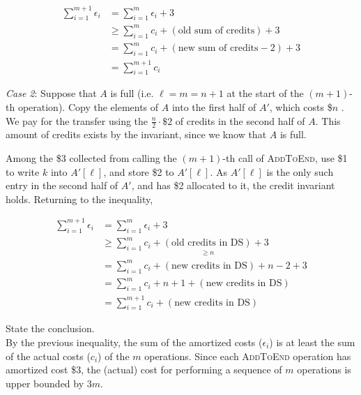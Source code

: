 \begin{description}
    \begin{align*}
        \sum_{i=1}^{m+1} \epsilon_i &= \sum_{i=1}^{m} \epsilon_i + 3 \\
        &\geq \sum_{i=1}^{m} c_i + (\text{old sum of credits}) + 3 \\
        &= \sum_{i=1}^{m} c_i + (\text{new sum of credits} - 2) + 3 \\
        &= \sum_{i=1}^{m+1} c_i
    \end{align*}

    \textit{Case 2}: Suppose that $A$ is full (i.e. $\ell = m = n + 1$ at the start of the $(m+1)$-th operation). Copy the elements of $A$ into the first half of $A'$, which costs \$$n$ . We pay for the transfer using the $\frac{n}{2} \cdot \$2$ of credits in the second half of $A$. This amount of credits exists by the invariant, since we know that $A$ is full. 

    Among the \$3 collected from calling the $(m+1)$-th call of \textsc{AddToEnd}, use \$1 to write $k$ into $A'[\ell]$, and store \$2 to $A'[\ell]$. As $A'[\ell]$ is the only such entry in the second half of $A'$, and has \$2 allocated to it, the credit invariant holds. Returning to the inequality,

    \begin{align*}
        \sum_{i=1}^{m+1} \epsilon_i &= \sum_{i=1}^{m} \epsilon_i + 3 \\
        &\geq \sum_{i=1}^{m} c_i + \underset{\geq n}{(\text{old credits in DS})} + 3 \\
        &= \sum_{i=1}^{m} c_i + (\text{new credits in DS}) + n - 2 + 3 \\
        &= \sum_{i=1}^{m} c_i + n + 1 + (\text{new credits in DS}) \\
        &= \sum_{i=1}^{m+1} c_i + (\text{new credits in DS})
    \end{align*}

    \item[Step 5] State the conclusion. \\
    By the previous inequality, the sum of the amortized costs ($\epsilon_i$) is at least the sum of the actual costs ($c_i$) of the $m$ operations. Since each \textsc{AddToEnd} operation has amortized cost \$3, the (actual) cost for performing a sequence of $m$ operations is upper bounded by $3m$. 

\end{description}
